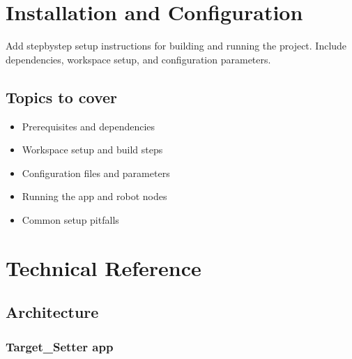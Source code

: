 \documentclass[letterpaper,10pt,english]{sphinxmanual}
\begin{document}
\chapter{Installation and Configuration}
\label{\detokenize{installation_and_configuration:installation-and-configuration}}\label{\detokenize{installation_and_configuration::doc}}
\sphinxAtStartPar
Add step\sphinxhyphen{}by\sphinxhyphen{}step setup instructions for building and running the project.
Include dependencies, workspace setup, and configuration parameters.


\section{Topics to cover}
\label{\detokenize{installation_and_configuration:topics-to-cover}}\begin{itemize}
\item {} 
\sphinxAtStartPar
Prerequisites and dependencies

\item {} 
\sphinxAtStartPar
Workspace setup and build steps

\item {} 
\sphinxAtStartPar
Configuration files and parameters

\item {} 
\sphinxAtStartPar
Running the app and robot nodes

\item {} 
\sphinxAtStartPar
Common setup pitfalls

\end{itemize}


\chapter{Technical Reference}
\label{\detokenize{technical_reference:technical-reference}}\label{\detokenize{technical_reference::doc}}

\section{Architecture}
\label{\detokenize{technical_reference:architecture}}
\noindent{}


\subsection{Target\_Setter app}
\label{\detokenize{technical_reference:target-setter-app}}
\noindent{}
\end{document}
